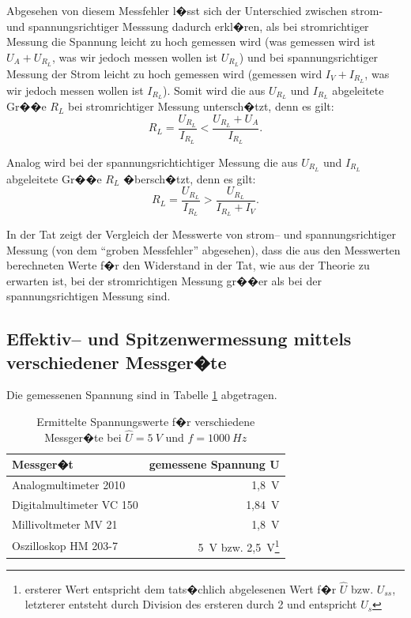 \documentclass[10pt]{scrartcl}
\begin{document}
Abgesehen von diesem Messfehler l�sst sich der Unterschied zwischen strom- und spannungsrichtiger Messsung dadurch erkl�ren, als bei stromrichtiger Messung die Spannung leicht zu hoch gemessen wird (was gemessen wird ist $U_A+U_{R_L}$, was wir jedoch messen wollen ist $U_{R_L}$) und bei spannungsrichtiger Messung der Strom leicht zu hoch gemessen wird (gemessen wird $I_V+I_{R_L}$, was wir jedoch messen wollen ist $I_{R_L}$). Somit wird die aus $U_{R_L}$ und $I_{R_L}$ abgeleitete Gr��e $R_L$ bei stromrichtiger Messung untersch�tzt, denn es gilt:
\begin{displaymath}
R_L = \frac{U_{R_L}}{I_{R_L}} < \frac{U_{R_L}+U_A}{I_{R_L}}.
\end{displaymath}

Analog wird bei der spannungsrichtichtiger Messung die aus $U_{R_L}$ und $I_{R_L}$ abgeleitete Gr��e $R_L$ �bersch�tzt, denn es gilt:
\begin{displaymath}
R_L = \frac{U_{R_L}}{I_{R_L}} > \frac{U_{R_L}}{I_{R_L}+I_V}.
\end{displaymath}

In der Tat zeigt der Vergleich der Messwerte von strom-- und spannungsrichtiger Messung (von dem "`groben Messfehler"' abgesehen), dass die aus den Messwerten berechneten Werte f�r den Widerstand in der Tat, wie aus der Theorie zu erwarten ist, bei der stromrichtigen Messung gr��er als bei der spannungsrichtigen Messung sind.

\subsection{Effektiv-- und Spitzenwermessung mittels verschiedener Messger�te}

Die gemessenen Spannung sind in Tabelle \ref{table:7} abgetragen.

\begin{table}
\begin{minipage}[t]{\textwidth}
\begin{center}
\begin{tabular}{|lr|}
\hline
    Messger�t & gemessene Spannung U \\
\hline
     Analogmultimeter 2010 & 1,8~V \\
     Digitalmultimeter VC 150 & 1,84~V \\
     Millivoltmeter MV 21 & 1,8~V \\
     Oszilloskop HM 203-7 & 5~V bzw. 2,5~V\footnote{ersterer Wert entspricht dem tats�chlich abgelesenen Wert f�r $\widehat{U}$ bzw. $U_{ss}$, letzterer entsteht durch Division des ersteren durch 2 und entspricht $U_s$}\\
\hline
\end{tabular}
\end{center}
\end{minipage}
\caption{Ermittelte Spannungswerte f�r verschiedene Messger�te bei $\widehat{U}=5~V$ und $f=1000~Hz$}
\label{table:7}
\end{table}
\end{document}
